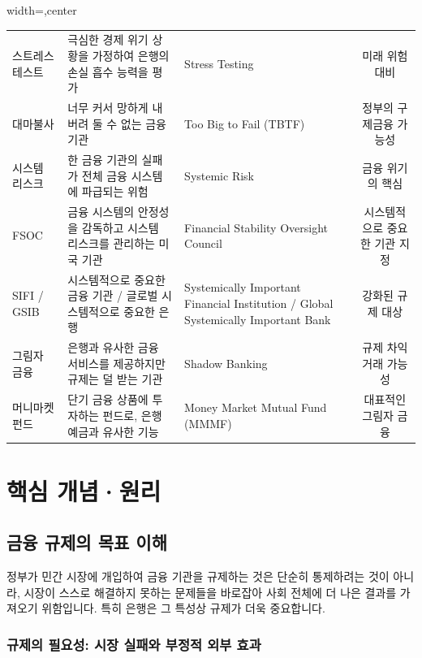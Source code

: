 \documentclass[11pt,a4paper]{article}
\theoremstyle{definition}
\begin{document}
\begin{adjustbox}{width=\textwidth,center}
\begin{tabular}{lllc}
스트레스 테스트 & 극심한 경제 위기 상황을 가정하여 은행의 손실 흡수 능력을 평가 & Stress Testing & 미래 위험 대비 \\
대마불사 & 너무 커서 망하게 내버려 둘 수 없는 금융 기관 & Too Big to Fail (TBTF) & 정부의 구제금융 가능성 \\
시스템 리스크 & 한 금융 기관의 실패가 전체 금융 시스템에 파급되는 위험 & Systemic Risk & 금융 위기의 핵심 \\
FSOC & 금융 시스템의 안정성을 감독하고 시스템 리스크를 관리하는 미국 기관 & Financial Stability Oversight Council & 시스템적으로 중요한 기관 지정 \\
SIFI / GSIB & 시스템적으로 중요한 금융 기관 / 글로벌 시스템적으로 중요한 은행 & Systemically Important Financial Institution / Global Systemically Important Bank & 강화된 규제 대상 \\
그림자 금융 & 은행과 유사한 금융 서비스를 제공하지만 규제는 덜 받는 기관 & Shadow Banking & 규제 차익거래 가능성 \\
머니마켓펀드 & 단기 금융 상품에 투자하는 펀드로, 은행 예금과 유사한 기능 & Money Market Mutual Fund (MMMF) & 대표적인 그림자 금융 \\
\bottomrule
\end{tabular}
\end{adjustbox}

\newpage
\section{핵심 개념·원리}

\subsection{금융 규제의 목표 이해}

정부가 민간 시장에 개입하여 금융 기관을 규제하는 것은 단순히 통제하려는 것이 아니라, 시장이 스스로 해결하지 못하는 문제들을 바로잡아 사회 전체에 더 나은 결과를 가져오기 위함입니다. 특히 은행은 그 특성상 규제가 더욱 중요합니다.

\subsubsection{규제의 필요성: 시장 실패와 부정적 외부 효과}
\end{document}
